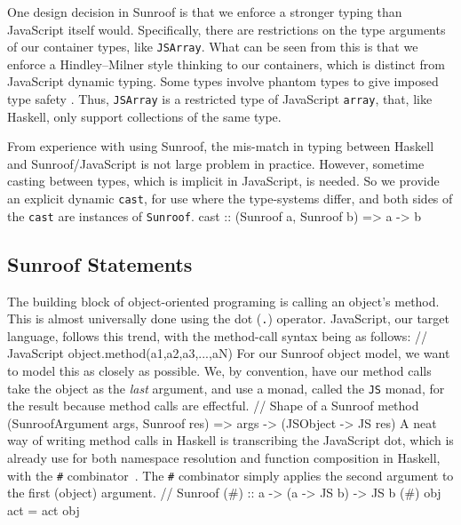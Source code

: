\documentclass{llncs}
\newcommand{\Src}[1]{{\tt{#1}}}
\newenvironment{Code}{\verbatim}{\endverbatim}
\begin{document}
One design decision in Sunroof is that we enforce a stronger typing than JavaScript itself would.
Specifically, there are restrictions on the type arguments of our container types,
like \Src{JSArray}. What can be seen from this is that we
enforce a Hindley–Milner style thinking to our containers,
which is distinct from JavaScript dynamic typing.
Some types involve
phantom types to give imposed type safety \cite{Cheney:03:FirstClassPhantomTypes}.
Thus, \Src{JSArray} is a restricted type of JavaScript \Src{array}, that, like Haskell,
only support collections of the same type.

From experience with using Sunroof,
the mis-match in typing between Haskell and Sunroof/JavaScript
is not large problem in practice.
However, sometime casting between types, which is implicit in JavaScript,
is needed. So we provide an explicit dynamic \Src{cast},
for use where the type-systems differ,
and both sides of the \Src{cast} are instances of \Src{Sunroof}.
\begin{Code}
cast :: (Sunroof a, Sunroof b) => a -> b
\end{Code}

\subsection{Sunroof Statements}

The building block of object-oriented programing is calling an object's method.
This is almost universally done using the dot (\Src{.}) operator. JavaScript, our target language, 
follows this trend, with the method-call syntax being as follows:
\begin{Code}
  // JavaScript
  object.method(a1,a2,a3,...,aN)
\end{Code}
For our Sunroof object model, we want to model this as closely as possible.
We, by convention, have our method calls take the object as the {\em last\/} argument,
and use a monad, called the \Src{JS} monad, for the result because method calls are effectful.
\begin{Code}
// Shape of a Sunroof method
(SunroofArgument args, Sunroof res) => args -> (JSObject -> JS res)
\end{Code}
A neat way of writing method calls in Haskell is transcribing the JavaScript dot, which is already use
for both namespace resolution and function composition in Haskell, with the \Src{\#} combinator~\cite{Shields:01:Babel}.
The \Src{\#} combinator simply applies the second argument to the first (object) argument.
\begin{Code}
// Sunroof        
(#) :: a -> (a -> JS b) -> JS b
(#) obj act = act obj
\end{Code}
\end{document}
